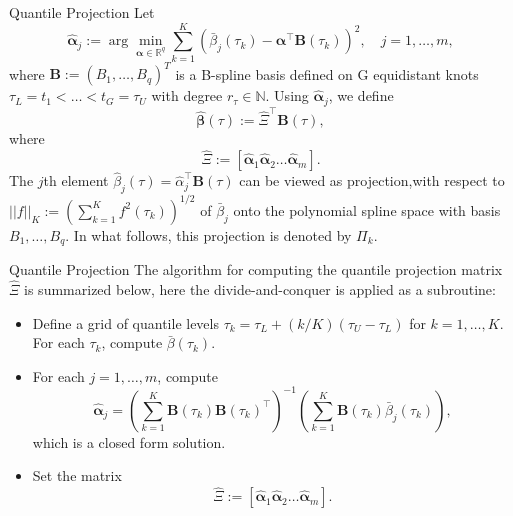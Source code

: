 \documentclass[11pt]{beamer}
\begin{document}
\begin{frame}{Quantile Projection}
Let
$$
\widehat{\boldsymbol{\alpha}}_{j}:=\arg \min _{\boldsymbol{\alpha} \in \mathbb{R}^{q}} \sum_{k=1}^{K}\left(\bar{\beta}_{j}\left(\tau_{k}\right)-\boldsymbol{\alpha}^{\top} \mathbf{B}\left(\tau_{k}\right)\right)^{2}, \quad j=1, \ldots, m,
$$
where $ \mathbf{B}:=(B_1,\dots,B_q)^T$ is a B-spline basis defined on G equidistant knots $\tau_{L}=t_{1}<\ldots<t_{G}=\tau_{U}$ with degree $r_{\tau}\in \mathbb{N}$. Using $\widehat{\boldsymbol{\alpha}}_{j}$, we define 
$$
\widehat{\boldsymbol{\beta}}(\tau):=\widehat{\Xi}^{\top} \mathbf{B}(\tau),
$$
where
$$
\widehat{\Xi}:=\left[\widehat{\boldsymbol{\alpha}}_{1} \widehat{\boldsymbol{\alpha}}_{2} \ldots \widehat{\boldsymbol{\alpha}}_{m}\right].
$$
{\color{blue}
The $j$th element $\widehat{\beta}_{j}(\tau)=\widehat{\alpha}_{j}^{\top} \mathbf{B}(\tau)$ can be viewed as projection,with respect to $||f||_K:=(\sum_{k=1}^K f^2(\tau_k))^{1/2}$ of $\bar{
\beta}_j$ onto the
polynomial spline space with basis $B_1,\dots,B_q$. In what follows, this projection
is denoted by $\Pi_k$.}
\end{frame}

\begin{frame}{Quantile Projection}
The algorithm for computing the quantile projection matrix $\widehat{\Xi}$ is summarized below, here the divide-and-conquer is applied as a subroutine:
\begin{itemize}
\item Define a 	grid of quantile levels $\tau_{k}=\tau_{L}+(k / K)\left(\tau_{U}-\tau_{L}\right)$ for $k=1,\dots,K$. For each $\tau_k$, compute $\bar{\beta}(\tau_k)$.
\item For each $j=1,\dots,m$, compute
$$
\widehat{\boldsymbol{\alpha}}_{j}=\left(\sum_{k=1}^{K} \mathbf{B}\left(\tau_{k}\right) \mathbf{B}\left(\tau_{k}\right)^{\top}\right)^{-1}\left(\sum_{k=1}^{K} \mathbf{B}\left(\tau_{k}\right) \bar{\beta}_{j}\left(\tau_{k}\right)\right),
$$
which is a closed form solution.
\item Set the matrix
$$
\hat{\Xi}:=\left[\widehat{\boldsymbol{\alpha}}_{1} \widehat{\boldsymbol{\alpha}}_{2} \ldots \widehat{\boldsymbol{\alpha}}_{m}\right].
$$
\end{itemize}
\end{frame}
\end{document}
